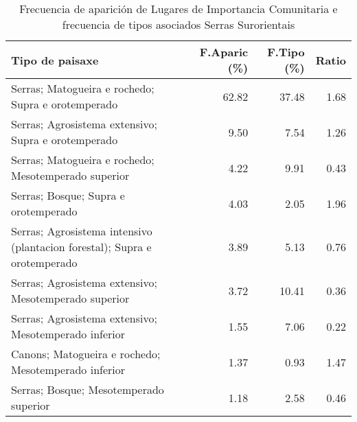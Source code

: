 \begin{table}[p]
\centering
\caption{Frecuencia de aparición de Lugares de Importancia Comunitaria e frecuencia de tipos asociados Serras Surorientais} 
\label{vnatura9}
\begin{tabular}{lrrr}
  \hline
Tipo de paisaxe & F.Aparic (\%) & F.Tipo (\%) & Ratio \\ 
  \hline
Serras; Matogueira e rochedo; Supra e orotemperado & 62.82 & 37.48 & 1.68 \\ 
  Serras; Agrosistema extensivo; Supra e orotemperado & 9.50 & 7.54 & 1.26 \\ 
  Serras; Matogueira e rochedo; Mesotemperado superior & 4.22 & 9.91 & 0.43 \\ 
  Serras; Bosque; Supra e orotemperado & 4.03 & 2.05 & 1.96 \\ 
  Serras; Agrosistema intensivo (plantacion forestal); Supra e orotemperado & 3.89 & 5.13 & 0.76 \\ 
  Serras; Agrosistema extensivo; Mesotemperado superior & 3.72 & 10.41 & 0.36 \\ 
  Serras; Agrosistema extensivo; Mesotemperado inferior & 1.55 & 7.06 & 0.22 \\ 
  Canons; Matogueira e rochedo; Mesotemperado inferior & 1.37 & 0.93 & 1.47 \\ 
  Serras; Bosque; Mesotemperado superior & 1.18 & 2.58 & 0.46 \\ 
   \hline
\end{tabular}
\end{table}
